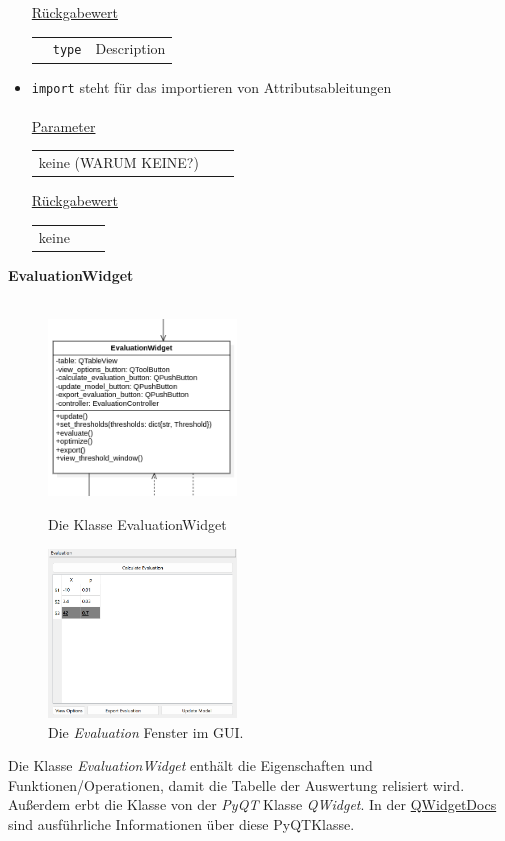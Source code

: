 \documentclass{article}
\begin{document}
\begin{itemize}
\underline{{Rückgabewert}}
\begin{tabular}{lll}
 & \texttt{type} & Description\\
\end{tabular}
\item \texttt{import} \newline steht für das importieren von Attributsableitungen
\\\\
\underline{{Parameter}} 
\begin{tabular}{lll}
keine (WARUM KEINE?)
\end{tabular}

\underline{{Rückgabewert}}
\begin{tabular}{lll}
keine
\end{tabular}
\end{itemize}

\newpage
\textbf{\large{EvaluationWidget}}\\\\
\begin{figure}[H]%
    \centering
    \begin{minipage}[b]{0.4\textwidth}
        \includegraphics[width=5cm]{entwurf/Entwurf_dokument/img/Alissa/EvaluationWidget.png}
        \caption{Die Klasse EvaluationWidget}
    \end{minipage}
    \hfill
    \begin{minipage}[b]{0.4\textwidth}
        \includegraphics[width=5cm]{entwurf/Entwurf_dokument/img/Alissa/evaluationGUI.png} 
    \caption{Die \textit{Evaluation} Fenster im GUI.}
    \end{minipage}
\end{figure}
Die Klasse \textit{EvaluationWidget} enthält die Eigenschaften und Funktionen/Operationen, damit die Tabelle der Auswertung relisiert wird. Außerdem erbt die Klasse von der \textit{PyQT} Klasse \textit{QWidget}. In der \href{https://doc.qt.io/qt-6/qwidget.html}{QWidget\textendash Docs} sind ausführliche Informationen über diese PyQT\textendash Klasse.
\newline \newline
\end{document}
